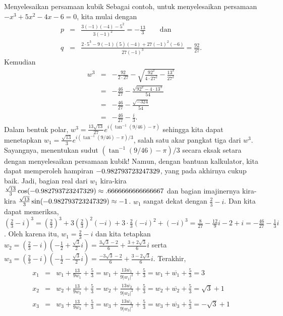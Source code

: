 \begin{digression}{Menyelesaikan persamaan kubik}
Sebagai contoh, untuk menyelesaikan persamaan $-x^{3}+5x^{2}-4x-6=0$,
kita mulai dengan
\begin{eqnarray*}
p & = & \frac{3(-1)(-4)-5^{2}}{3(-1)^{2}}=-\frac{13}{3}\qquad\mbox{dan}\\
q & = & \frac{2\cdot5^{3}-9(-1)(5)(-4)+27(-1)^{2}(-6)}{27(-1)^{3}}=\frac{92}{27}.
\end{eqnarray*}
Kemudian
\begin{eqnarray*}
w^{3} & = & -\frac{92}{2\cdot27}-\sqrt{\frac{92^{2}}{4\cdot27^{2}}-\frac{13^{3}}{27^{2}}}\\
 & = & -\frac{46}{27}-\frac{\sqrt{92^{2}-4\cdot13^{3}}}{54}\\
 & = & -\frac{46}{27}-\frac{\sqrt{-324}}{54}\\
 & = & -\frac{46}{27}-\frac{i}{3}.
\end{eqnarray*}
Dalam bentuk polar, $w^{3}=\frac{13\sqrt{13}}{27}e^{i(\tan^{-1}(9/46)-\pi)}$
sehingga kita dapat menetapkan $w_{1}=\frac{\sqrt{13}}{3}e^{i(\tan^{-1}(9/46)-\pi)/3}$,
salah satu akar pangkat tiga dari $w^{3}$. Sayangnya, menentukan
sudut $(\tan^{-1}(9/46)-\pi)/3$ secara eksak setara dengan menyelesaikan
persamaan kubik! Namun, dengan bantuan kalkulator, kita dapat memperoleh
hampiran $\text{\textminus}0.982793723247329$, yang pada akhirnya
cukup baik. Jadi, bagian real dari $w_{1}$ kira-kira $\frac{\sqrt{13}}{3}\cos(\text{\textminus}0.982793723247329)\approx.6666666666666667$
dan bagian imajinernya kira-kira $\frac{\sqrt{13}}{3}\sin(\text{\textminus}0.982793723247329)\approx-1$.
$w_{1}$ sangat dekat dengan $\frac{2}{3}-i$. Dan kita dapat memeriksa,
$\left(\frac{2}{3}-i\right)^{3}=\left(\frac{2}{3}\right)^{3}+3\left(\frac{2}{3}\right)^{2}(-i)+3\cdot\frac{2}{3}(-i)^{2}+(-i)^{3}=\frac{8}{27}-\frac{12}{9}i-2+i=-\frac{46}{27}-\frac{1}{3}i$.
Oleh karena itu, $w_{1}=\frac{2}{3}-i$ dan kita tetapkan $w_{2}=\left(\frac{2}{3}-i\right)\left(-\frac{1}{2}+\frac{\sqrt{3}}{2}i\right)=\frac{3\sqrt{3}-2}{6}+\frac{3+2\sqrt{3}}{6}i$
serta $w_{3}=\left(\frac{2}{3}-i\right)\left(-\frac{1}{2}-\frac{\sqrt{3}}{2}i\right)=\frac{-3\sqrt{3}-2}{6}+\frac{3-2\sqrt{3}}{6}i$.
Terakhir,
\begin{eqnarray*}
x_{1} & = & w_{1}+\frac{13}{9w_{1}}+\frac{5}{3}=w_{1}+\frac{13\overline{w_{1}}}{9|w_{1}|^{2}}+\frac{5}{3}=w_{1}+\overline{w_{1}}+\frac{5}{3}=3\\
x_{2} & = & w_{2}+\frac{13}{9w_{2}}+\frac{5}{3}=w_{2}+\frac{13\overline{w_{2}}}{9|w_{2}|^{2}}+\frac{5}{3}=w_{2}+\overline{w_{2}}+\frac{5}{3}=\sqrt{3}+1\\
x_{3} & = & w_{3}+\frac{13}{9w_{3}}+\frac{5}{3}=w_{3}+\frac{13\overline{w_{3}}}{9|w_{3}|^{2}}+\frac{5}{3}=w_{3}+\overline{w_{3}}+\frac{5}{3}=-\sqrt{3}+1
\end{eqnarray*}

\noindent\end{digression}

